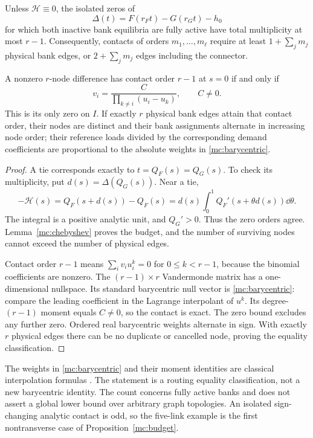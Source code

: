 \begin{proposition}\label{mc:budget}
Unless $\mathcal H\equiv0$, the isolated zeros of
\begin{equation}
 \Delta(t)=F(r_Ft)-G(r_Gt)-h_0
\end{equation}
for which both inactive bank equilibria are fully active have total multiplicity at most $r-1$. Consequently, contacts of orders $m_1,\ldots,m_\ell$ require at least $1+\sum_jm_j$ physical bank edges, or $2+\sum_jm_j$ edges including the connector.

A nonzero $r$-node difference has contact order $r-1$ at $s=0$ if and only if
\begin{equation}\label{mc:barycentric}
 v_i=\frac{C}{\prod_{k\ne i}(u_i-u_k)},\qquad C\ne0.
\end{equation}
This is its only zero on $I$. If exactly $r$ physical bank edges attain that contact order, their nodes are distinct and their bank assignments alternate in increasing node order; their reference loads divided by the corresponding demand coefficients are proportional to the absolute weights in \eqref{mc:barycentric}.
\end{proposition}
\begin{proof}
A tie corresponds exactly to $t=Q_F(s)=Q_G(s)$. To check its multiplicity, put $d(s)=\Delta(Q_G(s))$. Near a tie,
\begin{equation}\label{mc:unit}
 -\mathcal H(s)=Q_F(s+d(s))-Q_F(s)
 =d(s)\int_0^1Q_F'(s+\theta d(s))\dd\theta.
\end{equation}
The integral is a positive analytic unit, and $Q_G'>0$. Thus the zero orders agree. Lemma~\ref{mc:chebyshev} proves the budget, and the number of surviving nodes cannot exceed the number of physical edges.

Contact order $r-1$ means $\sum_i v_iu_i^k=0$ for $0\le k<r-1$, because the binomial coefficients are nonzero. The $(r-1)\times r$ Vandermonde matrix has a one-dimensional nullspace. Its standard barycentric null vector is \eqref{mc:barycentric}: compare the leading coefficient in the Lagrange interpolant of $u^k$. Its degree-$(r-1)$ moment equals $C\ne0$, so the contact is exact. The zero bound excludes any further zero. Ordered real barycentric weights alternate in sign. With exactly $r$ physical edges there can be no duplicate or cancelled node, proving the equality classification.
\end{proof}

The weights in \eqref{mc:barycentric} and their moment identities are classical interpolation formulas \cite{BT2004,deBoor2005}. The statement is a routing equality classification, not a new barycentric identity. The count concerns fully active banks and does not assert a global lower bound over arbitrary graph topologies. An isolated sign-changing analytic contact is odd, so the five-link example is the first nontransverse case of Proposition~\ref{mc:budget}.


